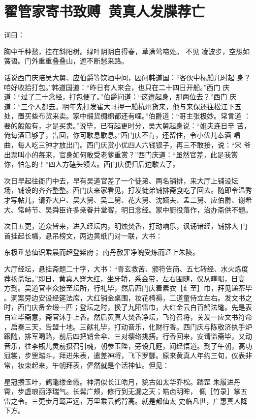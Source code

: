 \chapter{翟管家寄书致赙~黄真人发牒荐亡}

词曰：

胸中千种愁，挂在斜阳树。绿叶阴阴自得春，草满莺啼处。  不见
凌波步，空想如簧语。门外重重叠叠山，遮不断愁来路。

话说西门庆陪吴大舅、应伯爵等饮酒中间，因问韩道国：“客伙中标船几时起
身？咱好收拾打包。”韩道国道：“昨日有人来会，也只在二十四日开船。”西门
庆道：“过了二十念经，打包便了。”伯爵问道：“这遭起身，那两位去？”西门
庆道：“三个人都去。明年先打发崔大哥押一船杭州货来，他与来保还往松江下五
处，置买些布货来卖。家中缎货绸绵都还有哩。”伯爵道：“哥主张极妙。常言道
：要的般般有，才是买卖。”说毕，已有起更时分，吴大舅起身说：“姐夫连日辛
苦，俺每酒已够了，告回，你可歇息歇息。”西门庆不肯，还留住，令小优儿奉酒
唱曲，每人吃三钟才放出门。西门庆赏小优四人六钱银子，再三不敢接，说：“宋
爷出票叫小的每来，官身如何敢受老爹重赏？”西门庆道：“虽然官差，此是我赏
你，怕怎的！”四人方磕头领去。西门庆便归后边歇去了。

次日早起往衙门中去，早有吴道官差了一个徒弟、两名铺排，来大厅上铺设坛
场，铺设的齐齐整整。西门庆来家看见，打发徒弟铺排斋食吃了回去。随即令温秀
才写帖儿，请乔大户、吴大舅、吴二舅、花大舅、沈姨夫、孟二舅、应伯爵、谢希
大、常峙节、吴舜臣许多亲眷并堂客，明日念经。家中厨役落作，治办斋供不题。

次日五更，道众皆来，进入经坛内，明烛焚香，打动响乐，讽诵诸经，铺排大
门首挂起长幡，悬吊榜文，两边黄纸门对一联，大书：

东极垂慈仙识乘晨而超登紫府；
南丹赦罪净魄受炼而迳上朱陵。

大厅经坛，悬挂斋题二十字，大书：“青玄救苦、颁符告简、五七转经、水火炼度
荐扬斋坛。”即日，黄真人穿大红，坐牙轿，系金带，左右围随，仪从暄喝，日高
方到。吴道官率众接至坛所，行礼毕，然后西门庆着素衣［纟至］巾，拜见递茶毕
。洞案旁边安设经筵法席，大红销金桌围，妆花椅褥，二道童侍立左右。发文书之
时，西门庆备金缎一匹；登坛之时，换了九阳雷巾，大红金云白百鹤法氅。先是表
白宣毕斋意，斋官沐手上香。然后黄真人焚香净坛，飞符召将，关发一应文书符命
，启奏三天，告盟十地。三献礼毕，打动音乐，化财行香。西门庆与陈敬济执手炉
跟随，排军喝路，前后四把销金伞、三对缨络挑搭。行香回来，安请监斋毕，又动
音乐，往李瓶儿灵前摄召引魂，朝参玉陛，旁设几筵，闻经悟道。到了午朝，高功
冠裳，步罡踏斗，拜进朱表，遣差神将，飞下罗酆。原来黄真人年约三旬，仪表非
常，妆束起来，午朝拜表，俨然就是个活神仙。但见：

星冠攒玉叶，鹤氅缕金霞。神清似长江皓月，貌古如太华乔松。踏罡
朱履进丹霄，步虚琅函浮瑞气。长髯广颊，修行到无漏之天；皓齿明眸，
佩［竹录］掌五雷之令。三更步月鸾声远，万里乘云鹤背高。就是都仙太
史临凡世，广惠真人降下方。

